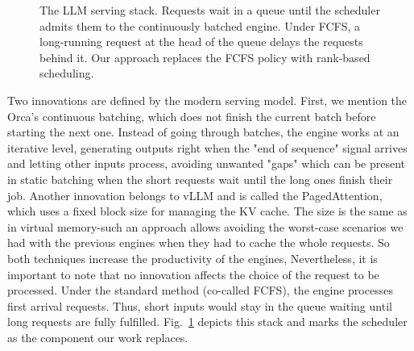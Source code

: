 \documentclass[conference]{IEEEtran}
\begin{document}
\begin{figure}[htbp]
\centering
{}
\caption{
The LLM serving stack. Requests wait in a queue until the
scheduler admits them to the continuously batched engine.
Under FCFS, a long-running request at the head of the queue
delays the requests behind it. Our approach replaces the
FCFS policy with rank-based scheduling.
}
\label{fig:llm-serving-stack}
\end{figure}

 Two innovations are defined by the modern serving model. First, we mention the Orca's continuous batching, which does not finish the current batch before starting the next one. Instead of going through batches, the engine works at an iterative level, generating outputs right when the "end of sequence" signal arrives and letting other inputs process, avoiding unwanted "gaps" which can be present in static batching when the short requests wait until the long ones finish their job. Another innovation belongs to vLLM and is called the PagedAttention, which uses a fixed block size for managing the KV cache. The size is the same as in virtual memory-such an approach allows avoiding the worst-case scenarios we had with the previous engines when they had to cache the whole requests. So both techniques increase the productivity of the engines, Nevertheless, it is important to note that no innovation affects the choice of the request to be processed. Under the standard method (co-called FCFS), the engine processes first arrival requests. Thus, short inputs would stay in the queue waiting until long requests are fully fulfilled. Fig.~\ref{fig:llm-serving-stack} depicts this stack and marks the scheduler as the component our work replaces.
\end{document}
